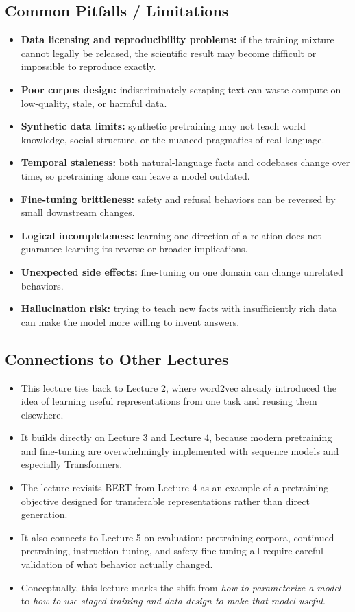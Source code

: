 \documentclass[11pt]{article}
\begin{document}
\subsection{Common Pitfalls / Limitations}
\begin{itemize}
    \item \textbf{Data licensing and reproducibility problems:} if the training mixture cannot legally be released, the scientific result may become difficult or impossible to reproduce exactly.
    \item \textbf{Poor corpus design:} indiscriminately scraping text can waste compute on low-quality, stale, or harmful data.
    \item \textbf{Synthetic data limits:} synthetic pretraining may not teach world knowledge, social structure, or the nuanced pragmatics of real language.
    \item \textbf{Temporal staleness:} both natural-language facts and codebases change over time, so pretraining alone can leave a model outdated.
    \item \textbf{Fine-tuning brittleness:} safety and refusal behaviors can be reversed by small downstream changes.
    \item \textbf{Logical incompleteness:} learning one direction of a relation does not guarantee learning its reverse or broader implications.
    \item \textbf{Unexpected side effects:} fine-tuning on one domain can change unrelated behaviors.
    \item \textbf{Hallucination risk:} trying to teach new facts with insufficiently rich data can make the model more willing to invent answers.
\end{itemize}

\subsection{Connections to Other Lectures}
\begin{itemize}
    \item This lecture ties back to Lecture 2, where word2vec already introduced the idea of learning useful representations from one task and reusing them elsewhere.
    \item It builds directly on Lecture 3 and Lecture 4, because modern pretraining and fine-tuning are overwhelmingly implemented with sequence models and especially Transformers.
    \item The lecture revisits BERT from Lecture 4 as an example of a pretraining objective designed for transferable representations rather than direct generation.
    \item It also connects to Lecture 5 on evaluation: pretraining corpora, continued pretraining, instruction tuning, and safety fine-tuning all require careful validation of what behavior actually changed.
    \item Conceptually, this lecture marks the shift from \emph{how to parameterize a model} to \emph{how to use staged training and data design to make that model useful}.
\end{itemize}
\end{document}
